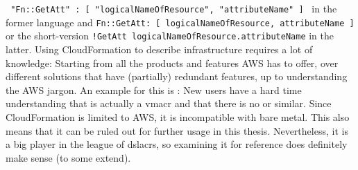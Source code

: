 \texttt{{ "Fn::GetAtt" : [ "logicalNameOfResource", "attributeName" ] }} in the former language and \texttt{Fn::GetAtt: [ logicalNameOfResource, attributeName ]} or the short-version
\newline %
\texttt{!GetAtt logicalNameOfResource.attributeName} in the latter.
\newline
Using CloudFormation to describe infrastructure requires a lot of knowledge: Starting from all the products and features AWS has to offer, over different solutions that have (partially) redundant features, up to understanding the AWS jargon. An example for this is : New users have a hard time understanding that  is actually a \gls{vmacr} and that there is no  or similar.
\newline
Since CloudFormation is limited to AWS, it is incompatible with bare metal. This also means that it can be ruled out for further usage in this thesis. Nevertheless, it is a big player in the league of \gls{dslacr}s, so examining it for reference does definitely make sense (to some extend).

